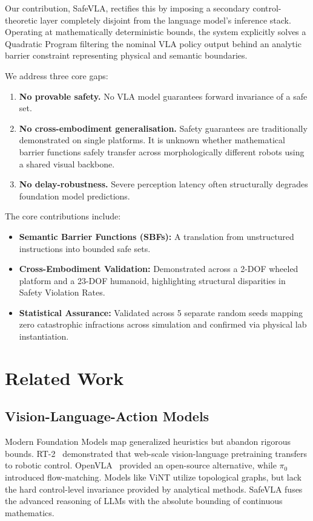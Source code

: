 \documentclass[conference]{IEEEtran}
\begin{document}
Our contribution, SafeVLA, rectifies this by imposing a secondary control-theoretic layer completely disjoint from the language model's inference stack. Operating at mathematically deterministic bounds, the system explicitly solves a Quadratic Program filtering the nominal VLA policy output behind an analytic barrier constraint representing physical and semantic boundaries. 

We address three core gaps:
\begin{enumerate}
    \item \textbf{No provable safety.} No VLA model guarantees forward invariance of a safe set.
    \item \textbf{No cross-embodiment generalisation.} Safety guarantees are traditionally demonstrated on single platforms. It is unknown whether mathematical barrier functions safely transfer across morphologically different robots using a shared visual backbone.
    \item \textbf{No delay-robustness.} Severe perception latency often structurally degrades foundation model predictions.
\end{enumerate}

The core contributions include:
\begin{itemize}
    \item \textbf{Semantic Barrier Functions (SBFs):} A translation from unstructured instructions into bounded safe sets. 
    \item \textbf{Cross-Embodiment Validation:} Demonstrated across a 2-DOF wheeled platform and a 23-DOF humanoid, highlighting structural disparities in Safety Violation Rates.
    \item \textbf{Statistical Assurance:} Validated across 5 separate random seeds mapping zero catastrophic infractions across simulation and confirmed via physical lab instantiation.
\end{itemize}

\section{Related Work}
\subsection{Vision-Language-Action Models}
Modern Foundation Models map generalized heuristics but abandon rigorous bounds. RT-2~\cite{rt2_2023} demonstrated that web-scale vision-language pretraining transfers to robotic control.
OpenVLA~\cite{openvla2024} provided an open-source alternative, while $\pi_0$~\cite{pi0_2025} introduced flow-matching.
Models like ViNT utilize topological graphs, but lack the hard control-level invariance provided by analytical methods. SafeVLA fuses the advanced reasoning of LLMs with the absolute bounding of continuous mathematics.
\end{document}
